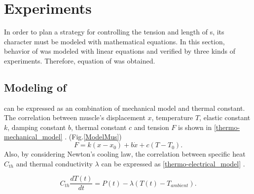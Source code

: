 \section{Experiments}\label{section_modeling}
In order to plan a strategy for controlling the tension and length of \scpnospace s, its character must be modeled with mathematical equations. In this section, behavior of \scp was modeled with linear equations and verified by three kinds of experiments. Therefore, equation of \anta was obtained.

\subsection{Modeling of \ANTA}\label{section_thermo_model}
\scp can be expressed as an combination of mechanical model and thermal constant. The correlation between muscle's displacement $x$, temperature $T$, elastic constant $k$, damping constant $b$, thermal constant $c$ and tension $F$ is shown in \eqref{thermo-mechanical_model} \cite{yip}.
(Fig.\ref{ModelMus})
\begin{equation} \label{thermo-mechanical_model}
F=k(x-x_0) + b\dot{x}+c(T-T_0).
\end{equation}
Also, by considering Newton's cooling law, the correlation between specific heat $C_{th}$ and thermal conductivity $\lambda$ can be expressed as \eqref{thermo-electrical_model} \cite{yip}.

\begin{equation} \label{thermo-electrical_model}
C_{th}\frac{dT(t)}{dt} = P(t) - \lambda(T(t)-T_{ambient}).
\end{equation}

